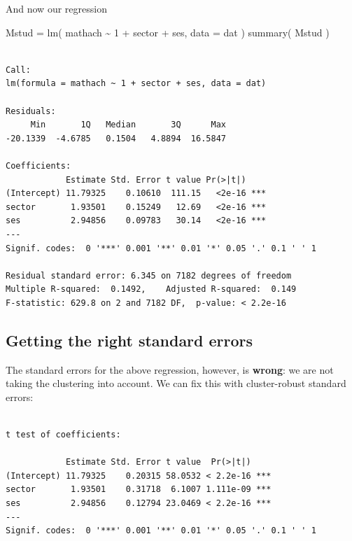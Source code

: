 \documentclass[
  letterpaper,
  DIV=11,
  numbers=noendperiod]{scrreprt}
\newenvironment{Shaded}{\begin{snugshade}}{\end{snugshade}}
\newcommand{\AttributeTok}[1]{\textcolor[rgb]{0.49,0.56,0.16}{#1}}
\newcommand{\DecValTok}[1]{\textcolor[rgb]{0.25,0.63,0.44}{#1}}
\newcommand{\FunctionTok}[1]{\textcolor[rgb]{0.02,0.16,0.49}{#1}}
\newcommand{\NormalTok}[1]{\textcolor[rgb]{0.00,0.44,0.13}{#1}}
\newcommand{\OtherTok}[1]{\textcolor[rgb]{0.00,0.44,0.13}{#1}}
\newcommand{\SpecialCharTok}[1]{\textcolor[rgb]{0.25,0.44,0.63}{#1}}
\begin{document}
And now our regression

\begin{Shaded}
\begin{Highlighting}[]
\NormalTok{Mstud }\OtherTok{=} \FunctionTok{lm}\NormalTok{( mathach }\SpecialCharTok{\textasciitilde{}} \DecValTok{1} \SpecialCharTok{+}\NormalTok{ sector }\SpecialCharTok{+}\NormalTok{ ses, }\AttributeTok{data =}\NormalTok{ dat )}
\FunctionTok{summary}\NormalTok{( Mstud )}
\end{Highlighting}
\end{Shaded}

\begin{verbatim}

Call:
lm(formula = mathach ~ 1 + sector + ses, data = dat)

Residuals:
     Min       1Q   Median       3Q      Max 
-20.1339  -4.6785   0.1504   4.8894  16.5847 

Coefficients:
            Estimate Std. Error t value Pr(>|t|)    
(Intercept) 11.79325    0.10610  111.15   <2e-16 ***
sector       1.93501    0.15249   12.69   <2e-16 ***
ses          2.94856    0.09783   30.14   <2e-16 ***
---
Signif. codes:  0 '***' 0.001 '**' 0.01 '*' 0.05 '.' 0.1 ' ' 1

Residual standard error: 6.345 on 7182 degrees of freedom
Multiple R-squared:  0.1492,    Adjusted R-squared:  0.149 
F-statistic: 629.8 on 2 and 7182 DF,  p-value: < 2.2e-16
\end{verbatim}

\hypertarget{getting-the-right-standard-errors}{%
\subsection{Getting the right standard
errors}\label{getting-the-right-standard-errors}}

The standard errors for the above regression, however, is
\textbf{wrong}: we are not taking the clustering into account. We can
fix this with cluster-robust standard errors:

\begin{Shaded}
\end{Shaded}

\begin{verbatim}

t test of coefficients:

            Estimate Std. Error t value  Pr(>|t|)    
(Intercept) 11.79325    0.20315 58.0532 < 2.2e-16 ***
sector       1.93501    0.31718  6.1007 1.111e-09 ***
ses          2.94856    0.12794 23.0469 < 2.2e-16 ***
---
Signif. codes:  0 '***' 0.001 '**' 0.01 '*' 0.05 '.' 0.1 ' ' 1
\end{verbatim}
\end{document}
